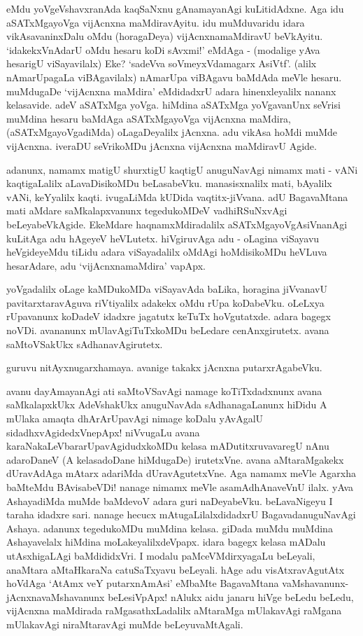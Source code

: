 eMdu yoVgeVshavxranAda kaqSaNxnu gAnamayanAgi kuLitidAdxne. Aga idu aSATxMgayoVga vijAcnxna maMdiravAyitu. idu muMduvaridu idara vikAsavaninxDalu oMdu (horagaDeya) vijAcnxnamaMdiravU beVkAyitu. `idakekxVnAdarU oMdu hesaru koDi sAvxmi!' eMdAga - (modalige yAva hesarigU viSayavilalx) Eke? `sadeVva soVmeyxVdamagarx AsiVtf'\label{74}. (alilx nAmarUpagaLa viBAgavilalx) nAmarUpa viBAgavu baMdAda meVle hesaru. muMdugaDe `vijAcnxna maMdira' eMdidadxrU adara hinenxleyalilx nananx kelasavide. adeV aSATxMga yoVga. hiMdina aSATxMga yoVgavanUnx seVrisi muMdina hesaru baMdAga aSATxMgayoVga vijAcnxna maMdira, (aSATxMgayoVgadiMda) oLagaDeyalilx jAcnxna. adu vikAsa hoMdi muMde vijAcnxna. iveraDU seVrikoMDu jAcnxna vijAcnxna maMdiravU Agide.

adanunx, namamx matigU shurxtigU kaqtigU anuguNavAgi nimamx mati - vANi kaqtigaLalilx aLavaDisikoMDu beLasabeVku. manasisxnalilx mati, bAyalilx vANi, keYyalilx kaqti. ivugaLiMda kUDida vaqtitx-jiVvana. adU BagavaMtana mati aMdare saMkalapxvanunx tegedukoMDeV vadhiRSuNxvAgi beLeyabeVkAgide. EkeMdare haqnamxMdiradalilx aSATxMgayoVgAsiVnanAgi kuLitAga adu hAgeyeV heVLutetx. hiVgiruvAga adu - oLagina viSayavu heVgideyeMdu tiLidu adara viSayadalilx oMdAgi hoMdisikoMDu heVLuva hesarAdare, adu `vijAcnxnamaMdira' vapApx.

yoVgadalilx oLage kaMDukoMDa viSayavAda baLika, horagina jiVvanavU pavitarxtaravAguva riVtiyalilx adakekx oMdu rUpa koDabeVku. oLeLxya rUpavanunx koDadeV idadxre jagatutx keTuTx hoVgutatxde. adara bagegx noVDi. avananunx mUlavAgiTuTxkoMDu beLedare cenAnxgirutetx. avana saMtoVSakUkx sAdhanavAgirutetx.

guruvu nitAyxnugarxhamaya. avanige takakx jAcnxna putarxrAgabeVku.

avanu dayAmayanAgi ati saMtoVSavAgi namage koTiTxdadxnunx avana saMkalapxkUkx AdeVshakUkx anuguNavAda sAdhanagaLanunx hiDidu A mUlaka amaqta dhArArUpavAgi nimage koDalu yAvAgalU sidadhxvAgidedxVnepApx! niVvugaLu avana karaNakaLeVbararUpavAgidudxkoMDu kelasa mADutitxruvavaregU nAnu adaroDaneV (A kelasadoDane hiMdugaDe) irutetxVne. avana aMtaraMgakekx dUravAdAga mAtarx adariMda dUravAgutetxVne. Aga namamx meVle Agarxha baMteMdu BAvisabeVDi! nanage nimamx meVle asamAdhAnaveVnU ilalx. yAva AshayadiMda muMde baMdevoV adara guri naDeyabeVku. beLavaNigeyu I taraha idadxre sari. nanage hecucx mAtugaLilalxdidadxrU BagavadanuguNavAgi Ashaya. adanunx tegedukoMDu muMdina kelasa. giDada muMdu muMdina Ashayavelalx hiMdina moLakeyalilxdeVpapx. idara bagegx kelasa mADalu utAsxhigaLAgi baMdididxVri. I modalu paMceVMdirxyagaLu beLeyali, anaMtara aMtaHkaraNa catuSaTxyavu beLeyali. hAge adu visAtxravAgutAtx hoVdAga `AtAmx veY putarxnAmAsi'\label{75} eMbaMte BagavaMtana vaMshavanunx-jAcnxnavaMshavanunx beLesiVpApx! nAlukx aidu janaru hiVge beLedu beLedu, vijAcnxna maMdirada raMgasathxLadalilx aMtaraMga mUlakavAgi raMgana mUlakavAgi niraMtaravAgi muMde beLeyuvaMtAgali.

